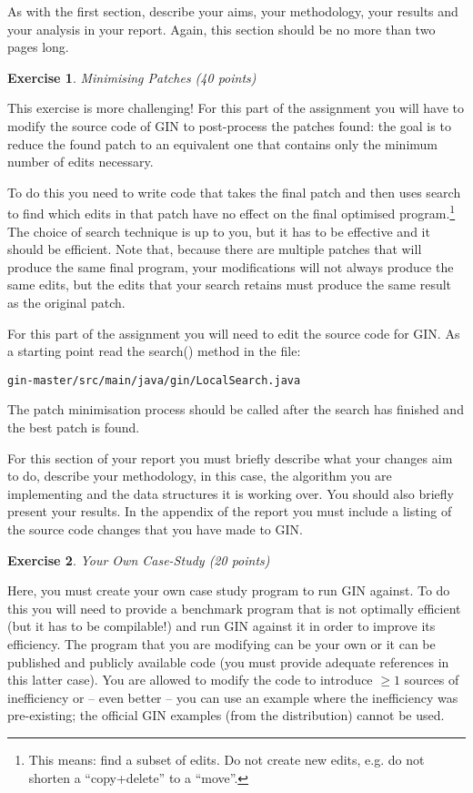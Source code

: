 \documentclass{pracs}
\newtheorem{exercise}{Exercise}
\begin{document}
As with the first section, describe your aims, your methodology, your results and your analysis in your report. Again, this section should be no more than two pages long.






\begin{exercise}
Minimising Patches (40 points)
\end{exercise}

This exercise is more challenging! 
For this part of the assignment you will have to modify the source code of GIN to post-process the patches found: the goal is to reduce the found patch to an equivalent one that contains only the minimum number of edits necessary. 

To do this you need to write code that takes the final patch and then uses search to find which edits in that patch have no effect on the final optimised program.\footnote{This means: find a subset of edits. Do not create new edits, e.g. do not shorten a ``copy+delete'' to a ``move''.} The choice of search technique is up to you, but it has to be effective and it should be efficient. Note that, because there are multiple patches that will produce the same final program, your modifications will not always produce the same edits, but the edits that your search retains must produce the same result as the original patch. 

For this part of the assignment you will need to edit the source code for GIN. As a starting point read the search() method in the file:

\texttt{gin-master/src/main/java/gin/LocalSearch.java}

The patch minimisation process should be called after the search has finished and the best patch is found. 

For this section of your report you must briefly describe what your changes aim to do, describe your methodology, in this case, the algorithm you are implementing and the data structures it is working over. You should also briefly present your results. In the appendix of the report you must include a listing of the source code changes that you have made to GIN.



\begin{exercise}
Your Own Case-Study (20 points)
\end{exercise}

Here, you must create your own case study program to run GIN against. To do this you will need to provide a benchmark program that is not optimally efficient (but it has to be compilable!) and run GIN against it in order to improve its efficiency. The program that you are modifying can be your own or it can be published and publicly available code (you must provide adequate references in this latter case). You are allowed to modify the code to introduce $\geq 1$ sources of inefficiency or -- even better -- you can use an example where the inefficiency was pre-existing; the official GIN examples (from the distribution) cannot be used.
\end{document}
